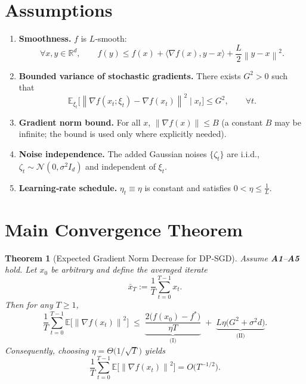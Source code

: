 \documentclass{article}
\newtheorem{theorem}{Theorem}
\newcommand{\E}{\mathbb{E}}
\newcommand{\norm}[1]{\left\|#1\right\|}
\newcommand{\grad}{\nabla}
\begin{document}
\section*{Assumptions}
\begin{enumerate}
    \item[\textbf{A1}] \textbf{Smoothness.} $f$ is $L$‑smooth:
    \[
        \forall x,y\in\mathbb{R}^{d},\qquad
        f(y)\le f(x)+\langle\grad f(x),y-x\rangle+\frac{L}{2}\norm{y-x}^{2}.
    \tag{A1}
    \]
    \item[\textbf{A2}] \textbf{Bounded variance of stochastic gradients.} There exists $G^{2}>0$ such that
    \[
        \E_{\xi_t}\!\bigl[\norm{\grad f(x_t;\xi_t)-\grad f(x_t)}^{2}\mid x_t\bigr]\le G^{2},
        \qquad\forall t.
    \tag{A2}
    \]
    \item[\textbf{A3}] \textbf{Gradient norm bound.} For all $x$, $\norm{\grad f(x)}\le B$ (a constant $B$ may be infinite; the bound is used only where explicitly needed).
    \item[\textbf{A4}] \textbf{Noise independence.} The added Gaussian noises $\{\zeta_t\}$ are i.i.d.,
    $\zeta_t\sim\mathcal{N}(0,\sigma^{2}I_d)$ and independent of $\xi_t$.
    \item[\textbf{A5}] \textbf{Learning‑rate schedule.} $\eta_t\equiv\eta$ is constant and satisfies $0<\eta\le \frac{1}{L}$.
\end{enumerate}

\section*{Main Convergence Theorem}
\begin{theorem}[Expected Gradient Norm Decrease for DP‑SGD]\label{thm:main}
Assume \textbf{A1}–\textbf{A5} hold. Let $x_0$ be arbitrary and define the averaged iterate
\[
\bar x_T:=\frac{1}{T}\sum_{t=0}^{T-1}x_t .
\]
Then for any $T\ge1$,
\[
\frac{1}{T}\sum_{t=0}^{T-1}\E\!\bigl[\norm{\grad f(x_t)}^{2}\bigr]
\;\le\;
\underbrace{\frac{2\bigl(f(x_0)-f^{*}\bigr)}{\eta T}}_{\text{(I)}}
\;+\;
\underbrace{L\eta\bigl(G^{2}+\sigma^{2}d\bigr)}_{\text{(II)}} .
\tag{1}
\]
Consequently, choosing $\eta =\Theta\!\bigl(1/\sqrt{T}\bigr)$ yields
\[
\frac{1}{T}\sum_{t=0}^{T-1}\E\!\bigl[\norm{\grad f(x_t)}^{2}\bigr]
=O\!\bigl(T^{-1/2}\bigr).
\]
\end{theorem}
\end{document}
